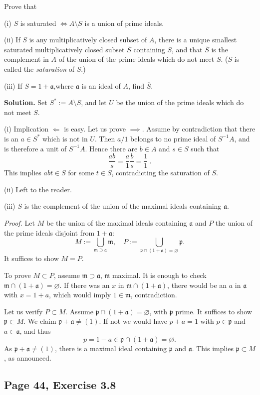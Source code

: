 \documentclass[parskip=half,fontsize=12pt]{scrartcl}%
\newcommand{\mf}{\mathfrak}
\newcommand{\aaa}{\mf a}
\newcommand{\mmm}{\mf m}
\newcommand{\ppp}{\mf p}
\begin{document}
Prove that

(i) $S$ is saturated $\iff A\setminus S$ is a union of prime ideals.

(ii) If $S$ is any multiplicatively closed subset of $A$, there is a unique smallest saturated multiplicatively closed subset $\overline S$ containing $S$, and that $\overline S$ is the complement in $A$ of the union of the prime ideals which do not meet $S$. ($S$ is called the \emph{saturation} of $S$.)

(iii) If $S=1+\aaa$,where $\aaa$ is an ideal of $A$, find $\overline S$.

\textbf{Solution.} Set $S^*:=A\setminus S$, and let $U$ be the union of the prime ideals which do not meet $S$.

(i) Implication $\Longleftarrow$ is easy. Let us prove $\implies$. Assume by contradiction that there is an $a\in S^*$ which is not in $U$. Then $a/1$ belongs to no prime ideal of $S^{-1}A$, and is therefore a unit of $S^{-1}A$. Hence there are $b\in A$ and $s\in S$ such that 
$$
\frac{ab}s=\frac a1\frac bs=\frac11\ .
$$ 
This implies $abt\in S$ for some $t\in S$, contradicting the saturation of $S$.

(ii) Left to the reader.

(iii) $\overline S$ is the complement of the union of the maximal ideals containing $\aaa$. 

\emph{Proof.} Let $M$ be the union of the maximal ideals containing $\aaa$ and $P$ the union of the prime ideals disjoint from $1+\aaa$:
$$
M:=\bigcup_{\mmm\supset\aaa}\mmm,\quad P:=\bigcup_{\ppp\cap(1+\aaa)=\varnothing}\ppp.
$$ 
It suffices to show $M=P$. 

To prove $M\subset P$, assume $\mmm\supset\aaa$, $\mmm$ maximal. It is enough to check $\mmm\cap(1+\aaa)=\varnothing$. If there was an $x$ in $\mmm\cap(1+\aaa)$, there would be an $a$ in $\aaa$ with $x=1+a$, which would imply $1\in\mmm$, contradiction. 

Let us verify $P\subset M$. Assume $\ppp\cap(1+\aaa)=\varnothing$, with $\ppp$ prime. It suffices to show $\ppp\subset M$. We claim $\ppp+\aaa\ne(1)$. If not we would have $p+a=1$ with $p\in\ppp$ and $a\in\aaa$, and thus 
$$
p=1-a\in\ppp\cap(1+\aaa)=\varnothing.
$$ 
As $\ppp+\aaa\ne(1)$, there is a maximal ideal containing $\ppp$ and $\aaa$. This implies $\ppp\subset M$, as announced.

\subsection{Page 44, Exercise 3.8}%
\end{document}
